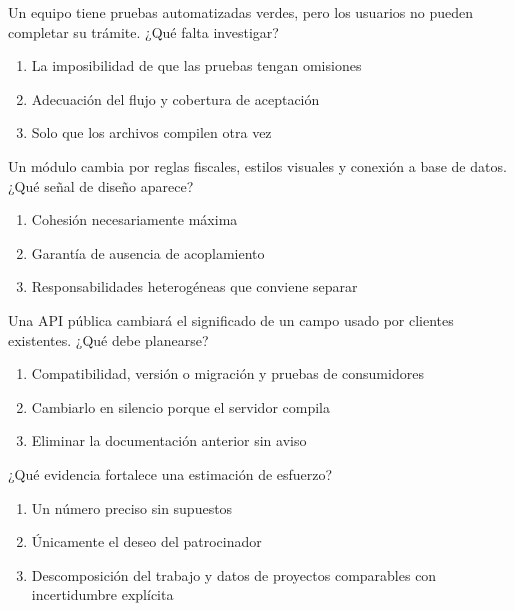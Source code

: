 \noindent\begin{minipage}{\linewidth}\setlength{\parskip}{4pt}\label{q:S-024}
Un equipo tiene pruebas automatizadas verdes, pero los usuarios no pueden completar su trámite. ¿Qué falta investigar?
\begin{enumerate}[label=\Alph*),nosep]
\item La imposibilidad de que las pruebas tengan omisiones
\item Adecuación del flujo y cobertura de aceptación
\item Solo que los archivos compilen otra vez
\end{enumerate}\end{minipage}\par\medskip

\noindent\begin{minipage}{\linewidth}\setlength{\parskip}{4pt}\label{q:S-025}
Un módulo cambia por reglas fiscales, estilos visuales y conexión a base de datos. ¿Qué señal de diseño aparece?
\begin{enumerate}[label=\Alph*),nosep]
\item Cohesión necesariamente máxima
\item Garantía de ausencia de acoplamiento
\item Responsabilidades heterogéneas que conviene separar
\end{enumerate}\end{minipage}\par\medskip

\noindent\begin{minipage}{\linewidth}\setlength{\parskip}{4pt}\label{q:S-026}
Una API pública cambiará el significado de un campo usado por clientes existentes. ¿Qué debe planearse?
\begin{enumerate}[label=\Alph*),nosep]
\item Compatibilidad, versión o migración y pruebas de consumidores
\item Cambiarlo en silencio porque el servidor compila
\item Eliminar la documentación anterior sin aviso
\end{enumerate}\end{minipage}\par\medskip

\noindent\begin{minipage}{\linewidth}\setlength{\parskip}{4pt}\label{q:S-027}
¿Qué evidencia fortalece una estimación de esfuerzo?
\begin{enumerate}[label=\Alph*),nosep]
\item Un número preciso sin supuestos
\item Únicamente el deseo del patrocinador
\item Descomposición del trabajo y datos de proyectos comparables con incertidumbre explícita
\end{enumerate}\end{minipage}\par\medskip

